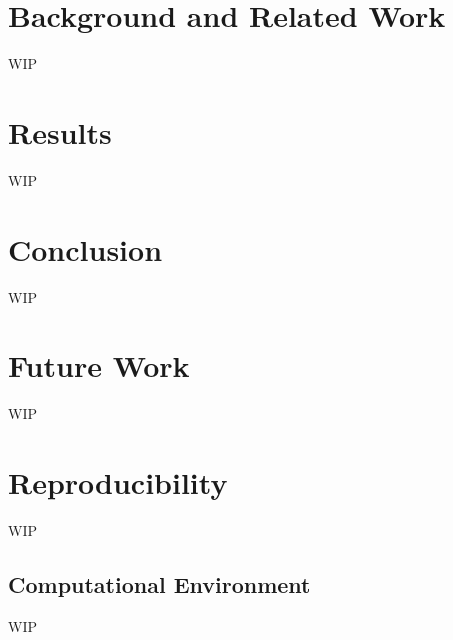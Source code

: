 \documentclass[12pt]{article}
\begin{document}
\section{Background and Related Work}
WIP

\section{Results}
WIP

\section{Conclusion}
WIP

\section{Future Work}
WIP

\section{Reproducibility} \label{subsec:reproducibility}
WIP

\subsection{Computational Environment}
WIP



\end{document}
